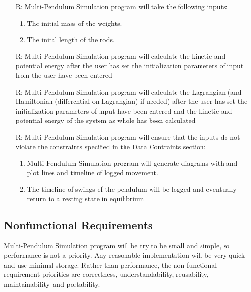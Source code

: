 \documentclass[12pt]{article}
\newcounter{reqnum} %
\newcommand{\progname}{Multi-Pendulum Simulation }
\begin{document}
\noindent \begin{itemize}

\item[R\refstepcounter{reqnum}\thereqnum \label{funinput}:] \progname program will 
  take the following inputs:
  \begin{enumerate} \item The initial mass of the weights. 
                    \item The inital length of the rods.
  \end{enumerate}
  
\item[R\refstepcounter{reqnum}\thereqnum \label{funkinpot}:] \progname program will 
calculate the kinetic and potential energy after the user has set the initialization 
parameters of input from the user have been entered

\item[R\refstepcounter{reqnum}\thereqnum \label{funlagham}:] \progname program will 
calculate the Lagrangian (and Hamiltonian (differential on Lagrangian) if needed) after the 
user has set the initialization parameters of input have been entered and the kinetic 
and potential energy of the system as whole has been calculated

\item[R\refstepcounter{reqnum}\thereqnum \label{funplot}:] \progname program
will ensure that the inputs do not violate the constraints specified in the Data Contraints section:
    \begin{enumerate} \item \progname program will 
generate diagrams with and plot lines and timeline of logged movement. 
\item The timeline of swings of the pendulum will be logged and eventually
return to a resting state in equilibrium
\end{enumerate}

\end{itemize}
\newpage
\subsection{Nonfunctional Requirements}

\progname program will be try to be small and simple, so performance is not a 
priority. Any reasonable implementation will be very quick and use minimal 
storage. Rather than performance, the non-functional requirement priorities 
are correctness, understandability, reusability, maintainability, and 
portability. 
\end{document}

